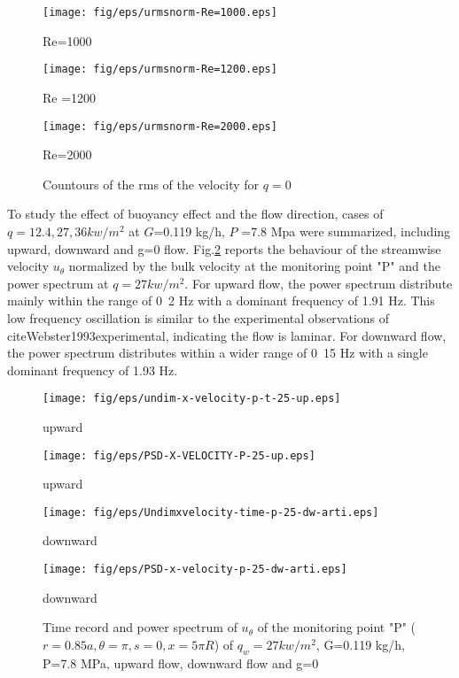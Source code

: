 \documentclass[a4paper,12pt]{article}
\begin{document}
\begin{figure}
	\begin{minipage}{0.24\linewidth}
		\centerline{\texttt{[image: fig/eps/urmsnorm-Re=1000.eps]}}
		\centerline{Re=1000}
	\end{minipage}
	\hfill
	\begin{minipage}{0.24\linewidth}
		\centerline{\texttt{[image: fig/eps/urmsnorm-Re=1200.eps]}}
		\centerline{Re =1200}
	\end{minipage}
	\hfill
	\begin{minipage}{0.24\linewidth}
		\centerline{\texttt{[image: fig/eps/urmsnorm-Re=2000.eps]}}
		\centerline{Re=2000}
	\end{minipage}
	\caption{Countours of the rms of the velocity for $q=0$}\label{countoursq=0}
\end{figure}

To study the effect of buoyancy effect and the flow direction, cases of $q=12.4, 27, 36 kw/m^2$ at $G$=0.119 kg/h, 	$P$ =7.8 Mpa were summarized, including upward, downward and g=0 flow. Fig.\ref{Time record} reports the behaviour of the streamwise velocity $u_\theta$ normalized by the bulk velocity at the monitoring point "P" and the power spectrum at $q=27 kw/m^2$. For upward flow, the power spectrum distribute mainly within the range of 0~2 Hz with a dominant frequency of 1.91 Hz. This low frequency oscillation is similar to the experimental observations of cite{Webster1993experimental}, indicating the flow is laminar. For downward flow, the power spectrum distributes within a wider range of 0~15 Hz with a single dominant frequency of 1.93 Hz.

\begin{figure} 
	\begin{minipage}{0.24\linewidth}
		\centerline{\texttt{[image: fig/eps/undim-x-velocity-p-t-25-up.eps]}}
		\centerline{upward}
	\end{minipage}
	\hfill
	\begin{minipage}{0.24\linewidth}
		\centerline{\texttt{[image: fig/eps/PSD-X-VELOCITY-P-25-up.eps]}}
		\centerline{upward}
	\end{minipage}
	\hfill
	\begin{minipage}{0.24\linewidth}
		\centerline{\texttt{[image: fig/eps/Undimxvelocity-time-p-25-dw-arti.eps]}}
		\centerline{downward}
	\end{minipage}
	\hfill
\begin{minipage}{0.24\linewidth}
	\centerline{\texttt{[image: fig/eps/PSD-x-velocity-p-25-dw-arti.eps]}}
	\centerline{downward}
\end{minipage}
	\caption{Time record and power spectrum of $u_\theta$ of the monitoring point "P" ($r=0.85a, \theta=\pi, s=0, x=5\pi R$) of $q_w=27 kw/m^2$, G=0.119 kg/h, P=7.8 MPa, upward flow, downward flow and g=0}\label{Time record}
\end{figure}
\end{document}
